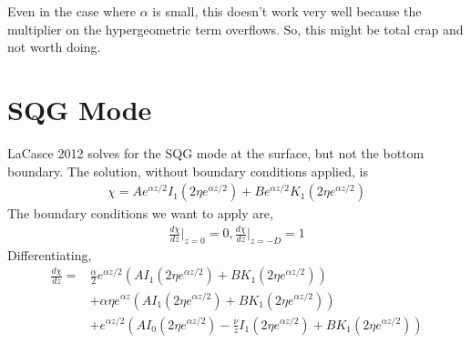 \documentclass[11pt]{article}
\begin{document}
Even in the case where $\alpha$ is small, this doesn't work very well because the multiplier on the hypergeometric term overflows. So, this might be total crap and not worth doing.

%
\section{SQG Mode}
%

LaCasce 2012 solves for the SQG mode at the surface, but not the bottom boundary. The solution, without boundary conditions applied, is
\begin{align}
\chi = A e^{\alpha z/2} I_1 \left( 2 \eta e^{\alpha z/2} \right) + B e^{\alpha z/2} K_1 \left( 2 \eta e^{\alpha z/2} \right)
\end{align}
The boundary conditions we want to apply are,
\begin{align}
\frac{d\chi}{dz} \biggr\rvert_{z=0} = 0, \frac{d\chi}{dz} \biggr\rvert_{z=-D} = 1
\end{align}
Differentiating,
\begin{align}
\frac{d\chi}{dz}=& \frac{\alpha}{2} e^{\alpha z/2} \left( A I_1 \left( 2 \eta e^{\alpha z/2} \right) + B K_1 \left( 2 \eta e^{\alpha z/2} \right) \right) \\
&+ \alpha \eta e^{\alpha z} \left( A I_1 \left( 2 \eta e^{\alpha z/2} \right) + B K_1 \left( 2 \eta e^{\alpha z/2} \right) \right)  \\
&+  e^{\alpha z/2} \left( A I_0 \left( 2 \eta e^{\alpha z/2} \right) - \frac{\nu}{z} I_1 \left( 2 \eta e^{\alpha z/2} \right) + B K_1 \left( 2 \eta e^{\alpha z/2} \right) \right) 
\end{align}
\end{document}
